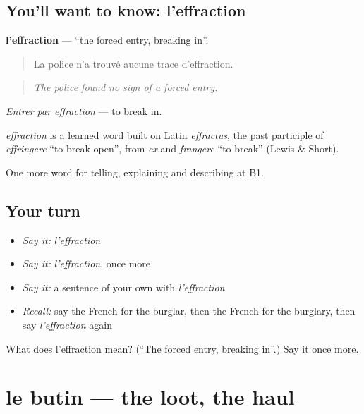 \subsection*{You'll want to know: l'effraction}
\textbf{l'effraction} — \textquotedblleft{}the forced entry, breaking in\textquotedblright{}.

\begin{quote}
La police n'a trouvé aucune trace d'effraction.
\end{quote}

\begin{quote}
\emph{The police found no sign of a forced entry.}
\end{quote}

\emph{Entrer par effraction} — to break in.

\begin{cousinweb}
\emph{effraction} is a learned word built on Latin \emph{effractus}, the past participle of \emph{effringere} \textquotedblleft{}to break open\textquotedblright{}, from \emph{ex} and \emph{frangere} \textquotedblleft{}to break\textquotedblright{} (Lewis \& Short).
\end{cousinweb}

\begin{grammarlens}[title={What you've built}]
One more word for telling, explaining and describing at B1.
\end{grammarlens}

\subsection*{Your turn}
\begin{itemize}
\raggedright
  \item \emph{Say it:} \emph{l'effraction}
  \item \emph{Say it:} \emph{l'effraction}, once more
  \item \emph{Say it:} a sentence of your own with \emph{l'effraction}
  \item \emph{Recall:} say the French for the burglar, then the French for the burglary, then say \emph{l'effraction} again
\end{itemize}

\begin{tcolorbox}[breakable,colback=teal!4,colframe=teal!35!black,title={Before you move on}]
What does l'effraction mean? (\textquotedblleft{}The forced entry, breaking in\textquotedblright{}.) Say it once more.
\end{tcolorbox}
\section[le butin]{le butin — the loot, the haul}

